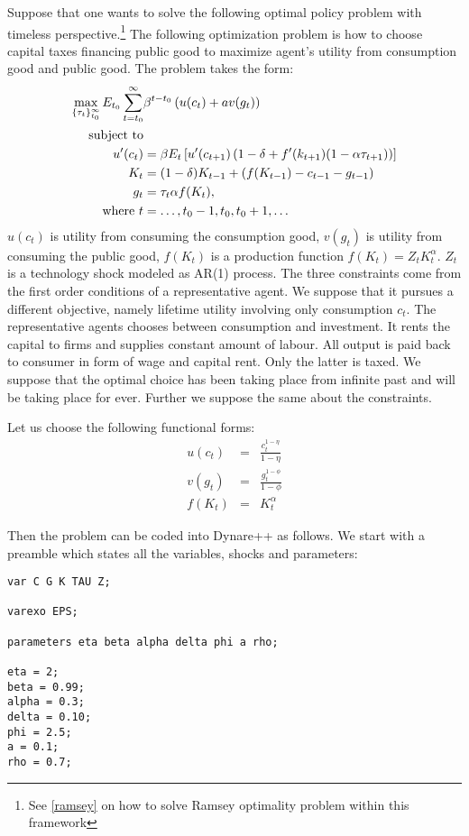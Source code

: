 \documentclass[10pt]{article}
\begin{document}
Suppose that one wants to solve the following optimal policy problem
with timeless perspective.\footnote{See \ref{ramsey} on how to solve
Ramsey optimality problem within this framework} The following
optimization problem is how to choose capital taxes financing public
good to maximize agent's utility from consumption good and public
good. The problem takes the form:
\begin{align*}
\max_{\{\tau_t\}_{t_0}^\infty} 
E_{t_0}\sum_{t=t_0}^\infty &\beta^{t-t_0}\left(u(c_t)+av(g_t)\right)\\
\hbox{subject\ to}&\\
u'(c_t) &=
\beta E_t\left[u'(c_{t+1})\left(1-\delta+f'(k_{t+1})(1-\alpha\tau_{t+1})\right)\right]\\
K_t &= (1-\delta)K_{t-1} + (f(K_{t-1}) - c_{t-1} - g_{t-1})\\
g_t &= \tau_t\alpha f(K_t),\\
\hbox{where\ } t & = \ldots,t_0-1,t_0,t_0+1,\ldots
\end{align*}
$u(c_t)$ is utility from consuming the consumption good, $v(g_t)$ is
utility from consuming the public good, $f(K_t)$ is a production
function $f(K_t) = Z_tK_t^\alpha$. $Z_t$ is a technology shock modeled
as AR(1) process. The three constraints come from the first order
conditions of a representative agent. We suppose that it pursues a
different objective, namely lifetime utility involving only
consumption $c_t$. The representative agents chooses between
consumption and investment. It rents the capital to firms and supplies
constant amount of labour. All output is paid back to consumer in form
of wage and capital rent. Only the latter is taxed. We suppose that
the optimal choice has been taking place from infinite past and will
be taking place for ever. Further we suppose the same about the
constraints.

Let us choose the following functional forms:
\begin{eqnarray*}
u(c_t) &=& \frac{c_t^{1-\eta}}{1-\eta}\\
v(g_t) &=& \frac{g_t^{1-\phi}}{1-\phi}\\
f(K_t) &=& K_t^\alpha
\end{eqnarray*}

Then the problem can be coded into Dynare++ as follows. We start with
a preamble which states all the variables, shocks and parameters:
{\small
\begin{verbatim}
var C G K TAU Z;

varexo EPS;

parameters eta beta alpha delta phi a rho; 

eta = 2;
beta = 0.99;
alpha = 0.3;
delta = 0.10;
phi = 2.5;
a = 0.1;
rho = 0.7;
\end{verbatim}
}
\end{document}
